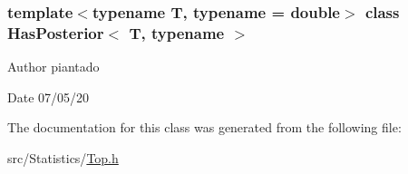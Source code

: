 \subsubsection*{template$<$typename T, typename = double$>$\newline
class Has\+Posterior$<$ T, typename $>$}

\begin{DoxyAuthor}{Author}
piantado 
\end{DoxyAuthor}
\begin{DoxyDate}{Date}
07/05/20 
\end{DoxyDate}


The documentation for this class was generated from the following file\+:\begin{DoxyCompactItemize}
\item 
src/\+Statistics/\hyperlink{_top_8h}{Top.\+h}\end{DoxyCompactItemize}
